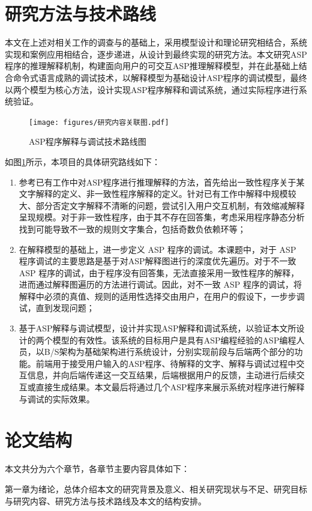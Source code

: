 \section{研究方法与技术路线}
本文在上述对相关工作的调查与的基础上，采用模型设计和理论研究相结合，系统实现和案例应用相结合，逐步递进，从设计到最终实现的研究方法。本文研究ASP程序的推理解释机制，构建面向用户的可交互ASP推理解释模型，并在此基础上结合命令式语言成熟的调试技术，以解释模型为基础设计ASP程序的调试模型，最终以两个模型为核心方法，设计实现ASP程序解释和调试系统，通过实际程序进行系统验证。
\begin{figure}[!ht] 
    \centering 
    \texttt{[image: figures/研究内容关联图.pdf]}
    \caption{ASP程序解释与调试技术路线图} 
    \label{fig:1_1} 
\end{figure}
如图\ref{fig:1_1}所示，本项目的具体研究路线如下：
\begin{enumerate}[label=(\arabic*),topsep=0pt]
    \setlength\itemsep{-0.3em}
    \item 参考已有工作中对ASP程序进行推理解释的方法，首先给出一致性程序关于某文字解释的定义、非一致性程序解释的定义。针对已有工作中解释中规模较大、部分否定文字解释不清晰的问题，尝试引入用户交互机制，有效缩减解释呈现规模。对于非一致性程序，由于其不存在回答集，考虑采用程序静态分析找到可能导致不一致的规则文字集合，包括奇数负依赖环等；
    \item 在解释模型的基础上，进一步定义 ASP 程序的调试。本课题中，对于 ASP 程序调试的主要思路是基于对ASP解释图进行的深度优先遍历。对于不一致 ASP 程序的调试，由于程序没有回答集，无法直接采用一致性程序的解释，进而通过解释图遍历的方法进行调试。因此，对不一致 ASP 程序的调试，将解释中必须的真值、规则的适用性选择交由用户，在用户的假设下，一步步调试，直到发现问题；
    \item 基于ASP解释与调试模型，设计并实现ASP解释和调试系统，以验证本文所设计的两个模型的有效性。该系统的目标用户是具有ASP编程经验的ASP编程人员，以B/S架构为基础架构进行系统设计，分别实现前段与后端两个部分的功能。前端用于接受用户输入的ASP程序、待解释的文字、解释与调试过程中交互信息，并向后端传递这一交互结果，后端根据用户的反馈，主动进行后续交互或直接生成结果。本文最后将通过几个ASP程序来展示系统对程序进行解释与调试的实际效果。
\end{enumerate}
\section{论文结构}
本文共分为六个章节，各章节主要内容具体如下： 

第一章为绪论，总体介绍本文的研究背景及意义、相关研究现状与不足、研究目标与研究内容、研究方法与技术路线及本文的结构安排。

